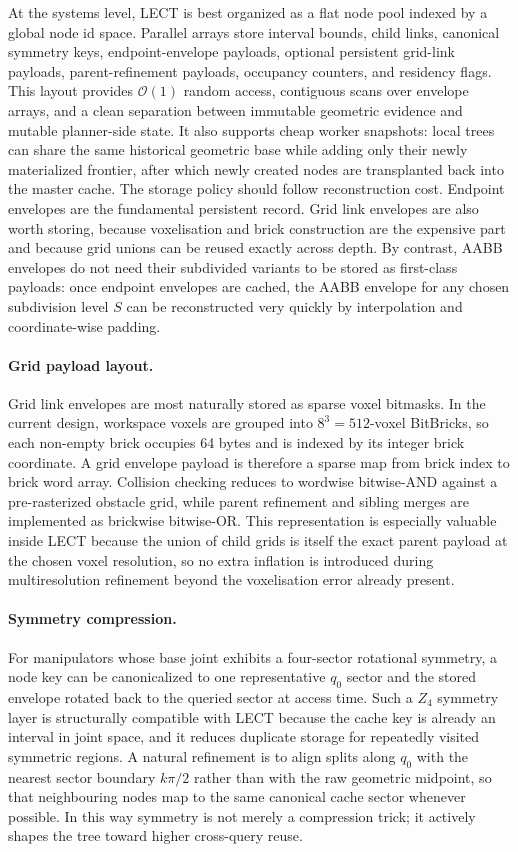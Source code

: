 \documentclass[journal]{IEEEtran}
\begin{document}
At the systems level, LECT is best organized as a flat node pool indexed by a
global node id space. Parallel arrays store interval bounds, child links,
canonical symmetry keys, endpoint-envelope payloads, optional persistent
grid-link payloads, parent-refinement payloads, occupancy counters, and
residency flags. This layout provides
$\mathcal{O}(1)$ random access, contiguous scans over envelope arrays, and a
clean separation between immutable geometric evidence and mutable planner-side
state. It also supports cheap worker snapshots: local trees can share the same
historical geometric base while adding only their newly materialized frontier,
after which newly created nodes are transplanted back into the master cache.
The storage policy should follow reconstruction cost. Endpoint envelopes are the
fundamental persistent record. Grid link envelopes are also worth storing,
because voxelisation and brick construction are the expensive part and because
grid unions can be reused exactly across depth. By contrast, AABB envelopes do
not need their subdivided variants to be stored as first-class payloads: once
endpoint envelopes are cached, the AABB envelope for any chosen subdivision
level $S$ can be reconstructed very quickly by interpolation and
coordinate-wise padding.

\paragraph{Grid payload layout.}
Grid link envelopes are most naturally stored as sparse voxel bitmasks. In the
current design, workspace voxels are grouped into $8^3=512$-voxel BitBricks, so
each non-empty brick occupies 64 bytes and is indexed by its integer brick
coordinate. A grid envelope payload is therefore a sparse map from brick index
to brick word array. Collision checking reduces to wordwise bitwise-AND against
a pre-rasterized obstacle grid, while parent refinement and sibling merges are
implemented as brickwise bitwise-OR. This representation is especially valuable
inside LECT because the union of child grids is itself the exact parent payload
at the chosen voxel resolution, so no extra inflation is introduced during
multiresolution refinement beyond the voxelisation error already present.

\paragraph{Symmetry compression.}
For manipulators whose base joint exhibits a four-sector rotational symmetry, a
node key can be canonicalized to one representative $q_0$ sector and the stored
envelope rotated back to the queried sector at access time. Such a $Z_4$
symmetry layer is structurally compatible with LECT because the cache key is
already an interval in joint space, and it reduces duplicate storage for
repeatedly visited symmetric regions. A natural refinement is to align splits
along $q_0$ with the nearest sector boundary $k\pi/2$ rather than with the raw
geometric midpoint, so that neighbouring nodes map to the same canonical cache
sector whenever possible. In this way symmetry is not merely a compression
trick; it actively shapes the tree toward higher cross-query reuse.
\end{document}
